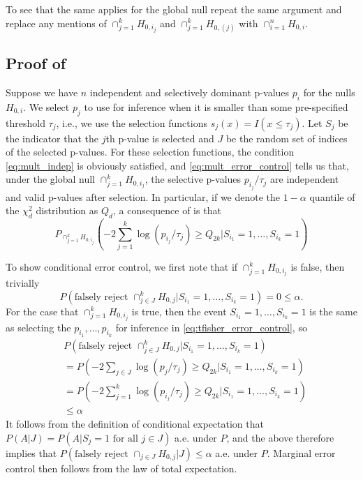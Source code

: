 \documentclass{article}
\begin{document}
\begin{appendix}
To see that the same applies for the global null repeat the same argument and replace any mentions of $\cap_{j = 1}^k H_{0, i_j}$ and $\cap_{j=1}^k H_{0, (j)}$ with $\cap_{i=1}^n H_{0, i}$. 

\subsection{Proof of }


Suppose we have $n$ independent and selectively dominant p-values $p_i$ for the nulls $H_{0, i}$. We select $p_j$ to use for inference when it is smaller than some pre-specified threshold $\tau_j$, i.e., we use the selection functions $s_{j}(x) = I(x \leq \tau_j)$. Let $S_j$ be the indicator that the $j$th p-value is selected and $J$ be the random set of indices of the selected p-values. For these selection functions, the condition \eqref{eq:mult_indep} is obviously satisfied, and \eqref{eq:mult_error_control} tells us that, under the global null $\cap_{j=1}^k H_{0, i_j} $, the selective p-values $p_{i_j}/\tau_j$ are independent and valid p-values after selection. In particular, if we denote the $1-\alpha$ quantile of the $\chi^2_{d}$ distribution as $Q_d$, a consequence of  is that 
\begin{equation*}
    \label{eq:tfisher_error_control}
    P_{\cap_{j=1}^k H_{0, i_j} }(-2 \sum_{j=1}^k \log(p_{i_j}/ \tau_j ) \geq Q_{2k}|S_{i_1} = 1, \dots,  S_{i_k} = 1)
\end{equation*}

To show conditional error control, we first note that if $ \cap_{j = 1}^k H_{0, i_j}$ is false, then trivially
\begin{equation*}
    P(\text{falsely reject } \cap_{j \in J}^k H_{0, j} |S_{i_1} = 1, \dots,  S_{i_k} = 1) = 0 \leq \alpha.
\end{equation*} 
For the case that $\cap_{j = 1}^k H_{0, i_j}$ is true, then the event $S_{i_1} = 1, \dots,  S_{i_k} = 1$ is the same as selecting the $p_{i_1}, \dots, p_{i_k}$ for inference in \eqref{eq:tfisher_error_control}, so 
\begin{align*}
    &P(\text{falsely reject } \cap_{j \in J}^k H_{0, j} |S_{i_1} = 1, \dots,  S_{i_k} = 1)\\
    &=P(-2 \sum_{j\in J} \log(p_{j}/ \tau_j ) \geq Q_{2k} |S_{i_1} = 1, \dots,  S_{i_k} = 1)\\
    &=  P(-2 \sum_{j=1}^k \log(p_{i_j}/ \tau_j ) \geq Q_{2k}|S_{i_1} = 1, \dots,  S_{i_k} = 1)\\
    &\leq \alpha 
\end{align*}
It follows from the definition of conditional expectation that $P(A| J) = P(A | S_j = 1 \text{ for all } j \in J)$ a.e. under $P$, and the above therefore implies that $P(\text{falsely reject } \cap_{j \in J} H_{0, j} | J)  \leq \alpha$ a.e. under $P$. Marginal error control then follows from the law of total expectation.


\end{appendix}
\end{document}
